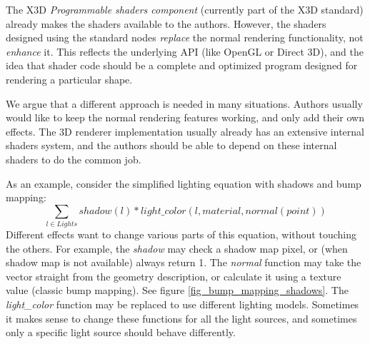 \documentclass{egpubl}
\begin{document}
The X3D \textit{Programmable shaders component} \cite{x3d:shaders} (currently part of the X3D standard)
already makes
the shaders available to the authors. However, the shaders designed using
the standard nodes
\textit{replace} the normal rendering functionality, not \textit{enhance} it.
This reflects the underlying API (like OpenGL or Direct 3D),
and the idea that shader code should be a complete and optimized program
designed for rendering a particular shape.

We argue that a different approach is needed in many situations.
Authors usually would like to keep the normal rendering features working,
and only add their own effects. The 3D renderer
implementation usually already has an extensive internal shaders system,
and the authors should be able to depend on these internal shaders
to do the common job.

As an example, consider the simplified lighting equation with shadows
and bump mapping:
$$ \sum_{l\in Lights} shadow(l) * light\_color(l, material, normal(point)) $$
Different effects want to change various parts of this equation,
without touching the others.
For example, the \textit{shadow} may check a shadow map pixel,
or (when shadow map is not available) always return 1.
The \textit{normal} function may take the vector straight from
the geometry description, or calculate it using a texture value (classic bump mapping).
See figure \ref{fig_bump_mapping_shadows}.
The \textit{light\_color} function may be replaced to use different
lighting models.
Sometimes it makes sense to change these functions
for all the light sources, and sometimes only a specific light source
should behave differently.
\end{document}
